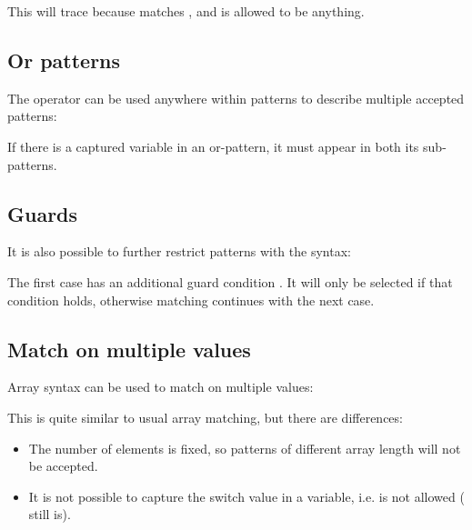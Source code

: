 
This will trace  because  matches , and  is allowed to be anything.

\subsection{Or patterns}
\label{lf-pattern-matching-or}

The \expr{|} operator can be used anywhere within patterns to describe multiple accepted patterns:


If there is a captured variable in an or-pattern, it must appear in both its sub-patterns.

\subsection{Guards}
\label{lf-pattern-matching-guards}

It is also possible to further restrict patterns with the  syntax:


The first case has an additional guard condition . It will only be selected if that condition holds, otherwise matching continues with the next case.

\subsection{Match on multiple values}
\label{lf-pattern-matching-tuples}

Array syntax can be used to match on multiple values:


This is quite similar to usual array matching, but there are differences:

\begin{itemize}
	\item The number of elements is fixed, so patterns of different array length will not be accepted.
	\item It is not possible to capture the switch value in a variable, i.e.  is not allowed ( still is).
\end{itemize}




